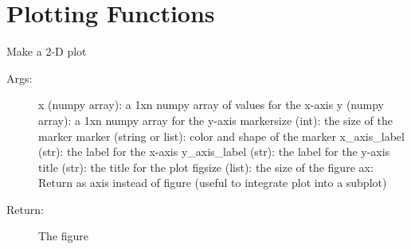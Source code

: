 \documentclass[letterpaper,10pt,english]{sphinxmanual}
\begin{document}
\chapter{Plotting Functions}
\label{\detokenize{Plot::doc}}\label{\detokenize{Plot:plotting-functions}}

\begin{fulllineitems}
\label{\detokenize{Plot:pyleoclim.Plot.plot}}
Make a 2-D plot
\begin{description}
\item[{Args:}] \leavevmode
x (numpy array): a 1xn numpy array of values for the x-axis
y (numpy array): a 1xn numpy array for the y-axis
markersize (int): the size of the marker
marker (string or list): color and shape of the marker
x\_axis\_label (str): the label for the x-axis
y\_axis\_label (str): the label for the y-axis
title (str): the title for the plot
figsize (list): the size of the figure
ax: Return as axis instead of figure (useful to integrate plot into a subplot)

\item[{Return:}] \leavevmode
The figure

\end{description}

\end{fulllineitems}

\end{document}
